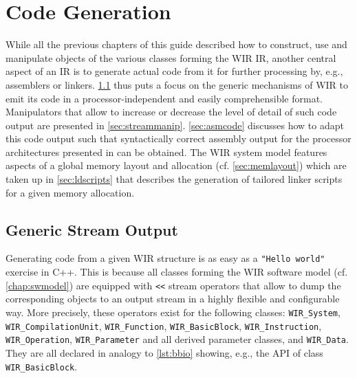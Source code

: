 \chapter{Code Generation}
\label{chap:codegen}
\renewcommand{\sectiontitle}{}

While all the previous chapters of this guide described how to construct, use and manipulate objects of the various classes forming the \gls{WIR} \gls{IR}, another central aspect of an \gls{IR} is to generate actual code from it for further processing by, e.g., assemblers or linkers.
\cref{sec:streamio} thus puts a focus on the generic mechanisms of \gls{WIR} to emit its code in a processor-independent and easily comprehensible format.
Manipulators that allow to increase or decrease the level of detail of such code output are presented in \cref{sec:streammanip}.
\cref{sec:asmcode} discusses how to adapt this code output such that syntactically correct assembly output for the processor architectures presented in  can be obtained.
The \gls{WIR} system model features aspects of a global memory layout and allocation (cf. \cref{sec:memlayout}) which are taken up in \cref{sec:ldscripts} that describes the generation of tailored linker scripts for a given memory allocation.


\section{Generic Stream Output}
\label{sec:streamio}

Generating code from a given \gls{WIR} structure is as easy as a \texttt{"Hello world"} exercise in C++.
This is because all classes forming the \gls{WIR} software model (cf. \cref{chap:swmodel}) are equipped with \texttt{<{}<} stream operators that allow to dump the corresponding objects to an output stream in a highly flexible and configurable way.
More precisely, these operators exist for the following classes: \texttt{WIR\_System}, \texttt{WIR\_CompilationUnit}, \texttt{WIR\_Function}, \texttt{WIR\_BasicBlock}, \texttt{WIR\_Instruction}, \texttt{WIR\_Operation}, \texttt{WIR\_Parameter} and all derived parameter classes, and \texttt{WIR\_Data}.
They are all declared in analogy to \cref{lst:bbio} showing, e.g., the \gls{API} of class \texttt{WIR\_BasicBlock}.

